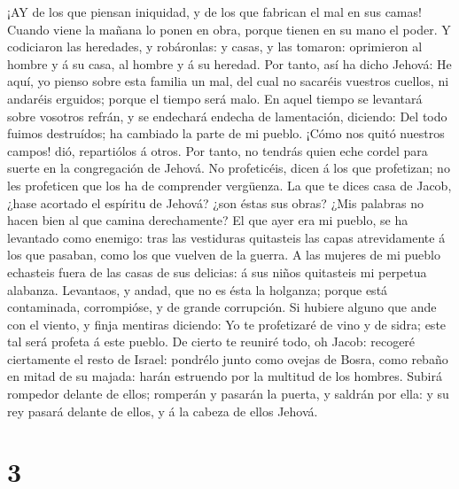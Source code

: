  ¡AY de los que piensan iniquidad, y de los que fabrican el
mal en sus camas! Cuando viene la mañana lo ponen en obra, porque tienen
en su mano el poder.  Y codiciaron las heredades, y
robáronlas: y casas, y las tomaron: oprimieron al hombre y á su casa, al
hombre y á su heredad.  Por tanto, así ha dicho Jehová: He
aquí, yo pienso sobre esta familia un mal, del cual no sacaréis vuestros
cuellos, ni andaréis erguidos; porque el tiempo será malo. 
En aquel tiempo se levantará sobre vosotros refrán, y se endechará
endecha de lamentación, diciendo: Del todo fuimos destruídos; ha
cambiado la parte de mi pueblo. ¡Cómo nos quitó nuestros campos! dió,
repartiólos á otros.  Por tanto, no tendrás quien eche
cordel para suerte en la congregación de Jehová.  No
profeticéis, dicen á los que profetizan; no les profeticen que los ha de
comprender vergüenza.  La que te dices casa de Jacob, ¿hase
acortado el espíritu de Jehová? ¿son éstas sus obras? ¿Mis palabras no
hacen bien al que camina derechamente?  El que ayer era mi
pueblo, se ha levantado como enemigo: tras las vestiduras quitasteis las
capas atrevidamente á los que pasaban, como los que vuelven de la
guerra.  A las mujeres de mi pueblo echasteis fuera de las
casas de sus delicias: á sus niños quitasteis mi perpetua alabanza.
 Levantaos, y andad, que no es ésta la holganza; porque
está contaminada, corrompióse, y de grande corrupción.  Si
hubiere alguno que ande con el viento, y finja mentiras diciendo: Yo te
profetizaré de vino y de sidra; este tal será profeta á este pueblo.
 De cierto te reuniré todo, oh Jacob: recogeré ciertamente
el resto de Israel: pondrélo junto como ovejas de Bosra, como rebaño en
mitad de su majada: harán estruendo por la multitud de los hombres.
 Subirá rompedor delante de ellos; romperán y pasarán la
puerta, y saldrán por ella: y su rey pasará delante de ellos, y á la
cabeza de ellos Jehová.

\hypertarget{section-2}{%
\section{3}\label{section-2}}

